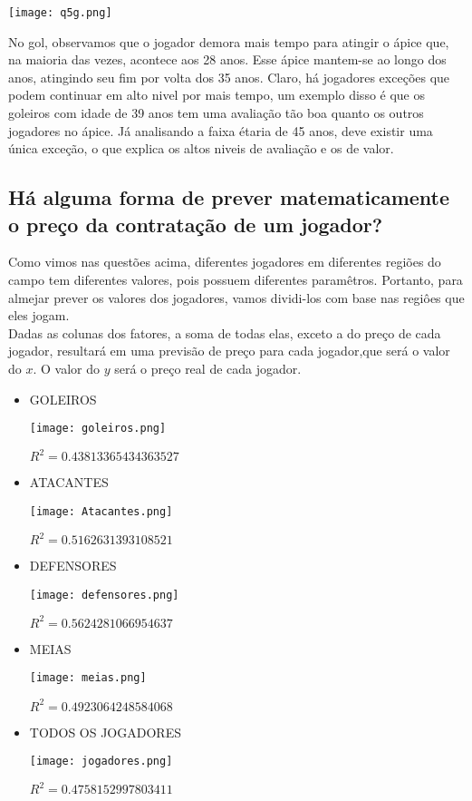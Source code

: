 \documentclass[12pt]{article}
\begin{document}
\texttt{[image: q5g.png]}



No gol, observamos que o jogador demora mais tempo para atingir o ápice que, na maioria das vezes, acontece aos 28 anos. Esse ápice mantem-se ao longo dos anos, atingindo seu fim por volta dos 35 anos. Claro, há jogadores exceções que podem continuar em alto nivel por mais tempo, um exemplo disso é que os goleiros com idade de 39 anos tem uma avaliação tão boa quanto os outros jogadores no ápice. Já analisando a faixa étaria de 45 anos, deve existir uma única exceção, o que explica os altos niveis de avaliação e os de valor.

\subsection{Há alguma forma de prever matematicamente o preço da contratação de um jogador?}
Como vimos nas questões acima, diferentes jogadores em diferentes regiões do campo tem diferentes valores, pois possuem diferentes paramêtros. Portanto, para almejar prever os valores dos jogadores, vamos dividi-los com base nas regiôes que eles jogam.\\
Dadas as colunas dos fatores, a soma de todas elas, exceto a do preço de cada jogador, resultará em uma previsão de preço para cada jogador,que será o valor do $x$. O valor do $y$ será o preço real de cada jogador.
\begin{itemize}
\item{GOLEIROS}


\texttt{[image: goleiros.png]}

$R^2 = 0.43813365434363527$
\\

\item{ATACANTES}


\texttt{[image: Atacantes.png]}

$R^2 = 0.5162631393108521$
\\
\item{DEFENSORES}


\texttt{[image: defensores.png]}

$R^2 = 0.5624281066954637$
\\
\item{MEIAS}


\texttt{[image: meias.png]}


$R^2 = 0.4923064248584068$
\\

\item{TODOS OS JOGADORES}


\texttt{[image: jogadores.png]}

$R^2 = 0.4758152997803411$

\end{itemize}
\end{document}
